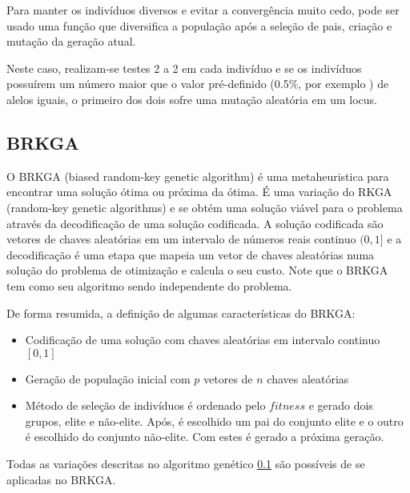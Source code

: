 \documentclass[12pt,a4paper]{article}
\begin{document}
        Para manter os indivíduos diversos e evitar a convergência muito cedo, pode ser usado uma função que diversifica a população após a seleção de pais, criação e mutação da geração atual.

        Neste caso, realizam-se testes 2 a 2 em cada indivíduo e se os indivíduos possuírem um número maior que o valor pré-definido (0.5$\%$, por exemplo ) de alelos iguais, o primeiro dos
        dois sofre uma mutação aleatória em um locus.


\subsection{BRKGA}
\label{sec:alg_genetic}

    O BRKGA (biased random-key genetic algorithm)\cite{gonccalves2011biased} é uma metaheuristica para encontrar uma solução ótima ou próxima da ótima. É uma variação do RKGA
    (random-key genetic algorithms) \cite{bean1994genetic} e se obtém uma solução viável para o problema através da decodificação de uma solução codificada. A solução codificada são vetores de
    chaves aleatórias em um intervalo de números reais continuo $(0,1]$ e a decodificação é uma etapa que mapeia um vetor de chaves aleatórias numa solução do problema de otimização e calcula o
    seu custo. Note que o BRKGA tem como seu algoritmo sendo independente do problema. 

    De forma resumida, a definição de algumas características do BRKGA: 


        \begin{itemize}

        \item Codificação de uma solução com chaves aleatórias em intervalo continuo $[0,1]$ 

        \item Geração de população inicial com $p$ vetores de $n$ chaves aleatórias

        \item Método de seleção de indivíduos é ordenado pelo $fitness$ e gerado dois grupos, elite e não-elite. Após, é escolhido um pai do conjunto elite e o outro é escolhido do conjunto
            não-elite. Com estes é gerado a próxima geração. 

        \end{itemize}

        Todas as variações descritas no algoritmo genético \ref{sec:alg_genetic} são possíveis de se aplicadas no BRKGA. 
\end{document}
